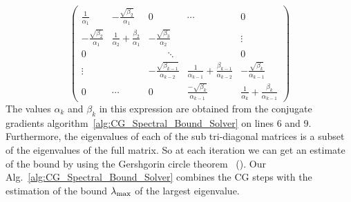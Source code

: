 \begin{equation}\label{eq:tridiag}
    \left(
    \begin{array}{ccccc}
      \frac{1}{\alpha_1} & - \frac{\sqrt{\beta_2}}{\alpha_1}  & 0 & \cdots & 0 \\
      - \frac{\sqrt{\beta_2}}{\alpha_1} & \frac{1}{\alpha_2} + \frac{\beta_2}{\alpha_1} & - \frac{\sqrt{\beta_3}}{\alpha_2} & & \vdots \\
0 &  & \quad\quad\ddots &  & 0 \\
      \vdots &  &-\frac{\sqrt{\beta_{k-1}}}{\alpha_{k-2}} & \frac{1}{\alpha_{k-1}} + \frac{\beta_{k-1}}{\alpha_{k-2}}  & -\frac{\sqrt{\beta_k}}{\alpha_{k-1}} \\
               0 & \cdots & 0 &\frac{-\sqrt{\beta_k}}{\alpha_{k-1}} &  \frac{1}{\alpha_k} + \frac{\beta_k}{\alpha_{k-1}}
    \end{array}
    \right)
\end{equation}
The values $\alpha_k$ and $\beta_k$ in this expression are obtained
  from the conjugate gradients algorithm~\ref{alg:CG_Spectral_Bound_Solver} on lines 6 and 9. Furthermore,
the eigenvalues of each of the sub tri-diagonal matrices is a subset
of the eigenvalues of the full matrix. So at each iteration we can get
an estimate of the bound by using the Gershgorin circle theorem ~(\cite{bell1965gershgorin}). Our Alg.~\ref{alg:CG_Spectral_Bound_Solver} combines the CG steps with the estimation of the bound $\lambda_{\rm max}$ of the largest eigenvalue.



